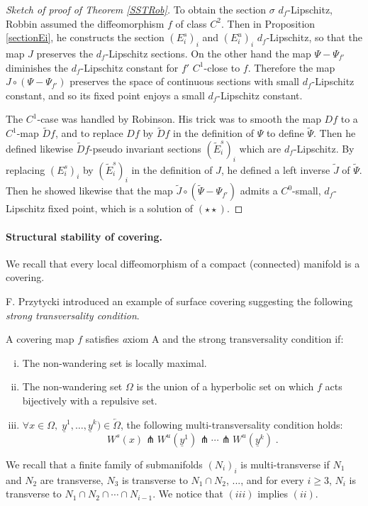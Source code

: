 \documentclass[11pt,openany,leqno]{article}
\begin{document}
\begin{proof}[Sketch of proof of Theorem \ref{SSTRob}]
To obtain the section $\sigma$ $d_f$-Lipschitz, Robbin assumed the diffeomorphism $f$ of class $C^2$. Then in Proposition \ref{sectionEi}, he constructs the section $(E^s_i)_i$ and  $(E^u_i)_i$ $d_f$-Lipschitz, so that the map $J$ preserves the  $d_f$-Lipschitz sections. On the other hand the map $\Psi-\Psi_{f'}$ diminishes the $d_f$-Lipschitz constant for $f'$ $C^1$-close to $f$. Therefore the map $J\circ (\Psi-\Psi_{f'})$ preserves the space of continuous sections with small $d_f$-Lipschitz constant, and so its fixed point enjoys a small $d_f$-Lipschitz constant.  

The $C^1$-case was handled by Robinson. His trick was to smooth the map $Df$ to a $C^1$-map $\tilde Df$, and to replace $Df$ by $\tilde Df$ in the definition of $\Psi$ to define $\tilde \Psi$. Then he defined  likewise $\tilde Df$-pseudo invariant sections $(\tilde E^s_i)_i$ which are $d_f$-Lipschitz. By replacing $(E^s_i)_i$ by $(\tilde E^s_i)_i$ in the definition of $J$, he defined a left inverse $\tilde J$ of $\tilde \Psi$. Then he showed likewise that the map $\tilde J\circ (\tilde \Psi-\Psi_{f'})$ admits a $C^0$-small, $d_f$-Lipschitz fixed point, which is a solution of $(\star\star)$. 
\end{proof}

\paragraph{Structural stability of covering.}
We recall that every local diffeomorphism of a compact (connected) manifold is a covering. 

F. Przytycki \cite{Pr77} introduced an example of surface covering suggesting the following \emph{strong transversality condition}.
 \begin{defi}
A covering map $f$ satisfies {\emph axiom A and the strong transversality condition} if:
\begin{enumerate}[(i)]
\item The non-wandering set is locally maximal.
\item  The non-wandering set $\Omega$ is the union of a hyperbolic set on which $f$ acts bijectively with a repulsive set.
\item $\forall x\in \Omega, \; \underline y^1,\dots,\underline  y^k)\in \overleftarrow \Omega$, the following multi-transversality condition holds:
$$W^s(x)\pitchfork W^u(\underline  y^1)\pitchfork \cdots \pitchfork W^u(\underline  y^k)\; .$$
\end{enumerate}
\end{defi}
We recall that a finite family of submanifolds $(N_i)_i$ is multi-transverse if $N_1$ and $N_2$ are transverse, $N_3$ is transverse to $N_1\cap N_2$, ..., and for every $i \ge 3$, $N_{i}$ is transverse to $N_1\cap N_2\cap \cdots \cap N_{i-1}$. We notice that $(iii)$ implies $(ii)$.
\end{document}

